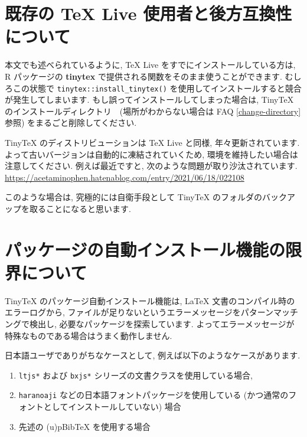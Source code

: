 \documentclass[
  xelatex,ja=standard,jafont=noto]{bxjsreport}
\providecommand{\tightlist}{%
  \setlength{\itemsep}{0pt}\setlength{\parskip}{0pt}}
\begin{document}
\hypertarget{ux65e2ux5b58ux306e-tex-live-ux4f7fux7528ux8005ux3068ux5f8cux65b9ux4e92ux63dbux6027ux306bux3064ux3044ux3066}{%
\section{既存の TeX Live
使用者と後方互換性について}\label{ux65e2ux5b58ux306e-tex-live-ux4f7fux7528ux8005ux3068ux5f8cux65b9ux4e92ux63dbux6027ux306bux3064ux3044ux3066}}

本文でも述べられているように, TeX Live をすでにインストールしている方は,
R パッケージの \textbf{tinytex}
で提供される関数をそのまま使うことができます. むしろこの状態で
\texttt{tinytex::install\_tinytex()}
を使用してインストールすると競合が発生してしまいます.
もし誤ってインストールしてしまった場合は, TinyTeX
のインストールディレクトリ　(場所がわからない場合は FAQ
\ref{change-directory}参照) をまるごと削除してください.

TinyTeX のディストリビューションは TeX Live と同様,
年々更新されています. よって古いバージョンは自動的に凍結されていくため,
環境を維持したい場合は注意してください. 例えば最近ですと,
次のような問題が取り沙汰されています.
\url{https://acetaminophen.hatenablog.com/entry/2021/06/18/022108}

このような場合は, 究極的には自衛手段として TinyTeX
のフォルダのバックアップを取ることになると思います.

\hypertarget{ux30d1ux30c3ux30b1ux30fcux30b8ux306eux81eaux52d5ux30a4ux30f3ux30b9ux30c8ux30fcux30ebux6a5fux80fdux306eux9650ux754cux306bux3064ux3044ux3066}{%
\section{パッケージの自動インストール機能の限界について}\label{ux30d1ux30c3ux30b1ux30fcux30b8ux306eux81eaux52d5ux30a4ux30f3ux30b9ux30c8ux30fcux30ebux6a5fux80fdux306eux9650ux754cux306bux3064ux3044ux3066}}

TinyTeX のパッケージ自動インストール機能は, LaTeX
文書のコンパイル時のエラーログから,
ファイルが足りないというエラーメッセージをパターンマッチングで検出し,
必要なパッケージを探索しています.
よってエラーメッセージが特殊なものである場合はうまく動作しません.

日本語ユーザでありがちなケースとして,
例えば以下のようなケースがあります.

\begin{enumerate}
\def\labelenumi{\arabic{enumi}.}
\tightlist
\item
  \texttt{ltjs*} および \texttt{bxjs*}
  シリーズの文書クラスを使用している場合,
\item
  \texttt{haranoaji} などの日本語フォントパッケージを使用している
  (かつ通常のフォントとしてインストールしていない) 場合
\item
  先述の (u)pBibTeX を使用する場合
\end{enumerate}
\end{document}
